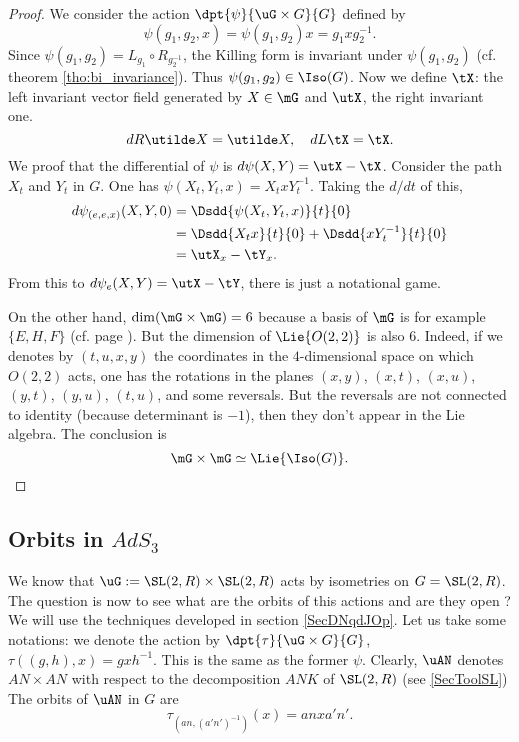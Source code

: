 \begin{proof}

We consider the action $\dpt{\psi}{\uG\times G}{G}$ defined by 
\[
   \psi(g_1,g_2,x)=\psi(g_1,g_2)x=g_1xg_2^{-1}.
\]
Since $\psi(g_1,g_2)=L_{g_1}\circ R_{g_2^{-1}}$, the Killing form is invariant under $\psi(g_1,g_2)$ (cf. theorem \ref{tho:bi_invariance}). Thus $\psi(g_1,g_2)\in\Iso(G)$. Now we define $\tX$: the left invariant vector field generated by $X\in\mG$ and $\utX$, the right invariant one.
\[
   dR\utilde X=\utilde X,\quad dL\tX=\tX.
\]
We proof that the differential of $\psi$ is $d\psi(X,Y)=\utX-\tX$. Consider the path $X_t$ and $Y_t$ in $G$. One has $\psi(X_t,Y_t,x)=X_txY_t^{-1}$. Taking the $d/dt$ of this,
\begin{equation}
\begin{split}
d\psi_{(e,e,x)}(X,Y,0)&=\Dsdd{\psi(X_t,Y_t,x)}{t}{0}\\
                      &=\Dsdd{X_tx}{t}{0}+\Dsdd{xY_t^{-1}}{t}{0}\\
                      &=\utX_x-\tY_x.
\end{split}
\end{equation}
From this to $d\psi_e(X,Y)=\utX-\tY$, there is just a notational game.

On the other hand, $\dim(\mG\times\mG)=6$ because a basis of $\mG$ is for example $\{E,H,F\}$ (cf. page \pageref{SecToolSL}). But the dimension of $\Lie{O(2,2)}$ is also $6$. Indeed, if we denotes by $(t,u,x,y)$ the coordinates in the $4$-dimensional space on which $O(2,2)$ acts, one has the rotations in the planes $(x,y)$, $(x,t)$, $(x,u)$, $(y,t)$, $(y,u)$, $(t,u)$, and some reversals. But the reversals are not connected to identity (because determinant is $-1$), then they don't appear in the Lie algebra.
The conclusion is 
\[
\mG\times\mG\simeq\Lie{\Iso(G)}.
\]

\end{proof}

\subsection{Orbits in \texorpdfstring{$AdS_3$}{AdS3}}

We know that $\uG:=\SL(2,R)\times\SL(2,R)$ acts by isometries on $G=\SL(2,R)$. The question is now to see what are the orbits of this actions and are they open ? We will use the techniques developed in section \ref{SecDNqdJOp}. Let us take some notations: we denote the action by $\dpt{\tau}{\uG\times G}{G}$, $\tau((g,h),x)=gxh^{-1}$. This is the same as the former $\psi$. Clearly, $\uAN$ denotes $AN\times AN$ with respect to the decomposition $ANK$ of $\SL(2,R)$ (see \ref{SecToolSL}) The orbits of $\uAN$ in $G$ are
\[
   \tau_{ (an,(a'n')^{-1}) }(x)=anxa'n'.
\]

